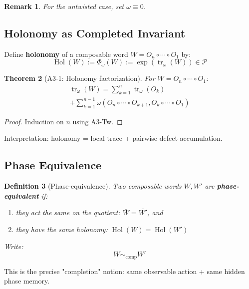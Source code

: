 \documentclass[12pt, oneside]{article}
\newtheorem{theorem}{Theorem}[section]
\newtheorem{definition}[theorem]{Definition}
\newtheorem{remark}[theorem]{Remark}
\DeclareMathOperator{\tr}{tr}
\DeclareMathOperator{\Hol}{Hol}
\begin{document}
\begin{remark}
For the untwisted case, set $\omega \equiv 0$.
\end{remark}

\subsection{Holonomy as Completed Invariant}

Define \textbf{holonomy} of a composable word $W = O_n \circ \cdots \circ O_1$ by:
\begin{equation}
\Hol(W) := \Phi_\omega(W) := \exp(\tr_\omega(W)) \in \mathcal{P}
\end{equation}

\begin{theorem}[A3-1: Holonomy factorization]
For $W = O_n \circ \cdots \circ O_1$:
\begin{multline}
\tr_\omega(W) = \sum_{k=1}^n \tr_\omega(O_k) \\ + \sum_{k=1}^{n-1} \omega(O_n \circ \cdots \circ O_{k+1}, O_k \circ \cdots \circ O_1)
\end{multline}
\end{theorem}

\begin{proof}
Induction on $n$ using A3-Tw.
\end{proof}

Interpretation: holonomy = local trace + pairwise defect accumulation.

\subsection{Phase Equivalence}

\begin{definition}[Phase-equivalence]
Two composable words $W, W'$ are \textbf{phase-equivalent} if:
\begin{enumerate}
    \item they act the same on the quotient: $\bar{W} = \bar{W'}$, and
    \item they have the same holonomy: $\Hol(W) = \Hol(W')$
\end{enumerate}
Write:
\begin{equation}
W \sim_{\text{comp}} W'
\end{equation}
\end{definition}

This is the precise "completion" notion: same observable action + same hidden phase memory.
\end{document}
